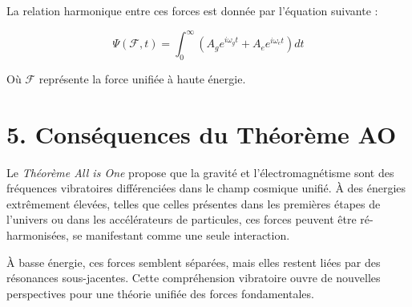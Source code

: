 \documentclass{article}
\begin{document}
La relation harmonique entre ces forces est donnée par l'équation suivante :

\[
\Psi(\mathcal{F}, t) = \int_{0}^{\infty} \left( A_g e^{i\omega_g t} + A_e e^{i\omega_e t} \right) dt
\]

Où \( \mathcal{F} \) représente la force unifiée à haute énergie.

\section{5. Conséquences du Théorème AO}

Le \textit{Théorème All is One} propose que la gravité et l'électromagnétisme sont des fréquences vibratoires différenciées dans le champ cosmique unifié. À des énergies extrêmement élevées, telles que celles présentes dans les premières étapes de l'univers ou dans les accélérateurs de particules, ces forces peuvent être ré-harmonisées, se manifestant comme une seule interaction.

À basse énergie, ces forces semblent séparées, mais elles restent liées par des résonances sous-jacentes. Cette compréhension vibratoire ouvre de nouvelles perspectives pour une théorie unifiée des forces fondamentales.
\end{document}
